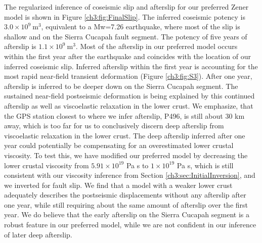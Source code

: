 The regularized inference of coseismic slip and afterslip for our
preferred Zener model is shown in Figure \ref{ch3:fig:FinalSlip}.  The
inferred coseismic potency is $3.0\times10^{9}\ \mathrm{m}^3$,
equivalent to a Mw=7.26 earthquake, where most of the slip is shallow
and on the Sierra Cucapah fault segment.  The potency of five years of
afterslip is $1.1\times10^{9}\ \mathrm{m}^3$. Most of the afterslip in
our preferred model occurs within the first year after the earthquake
and coincides with the location of our inferred coseismic slip.
Inferred afterslip within the first year is accounting for the most
rapid near-field transient deformation (Figure \ref{ch3:fig:S3}).  After one year,
afterslip is inferred to be deeper down on the Sierra Cucapah segment.
The sustained near-field postseismic deformation is being explained by
this continued afterslip as well as viscoelastic relaxation in the
lower crust. We emphasize, that the GPS station closest to where we
infer afterslip, P496, is still about 30 km away, which is too far for
us to conclusively discern deep afterslip from viscoelastic relaxation
in the lower crust.  The deep afterslip inferred after one year could
potentially be compensating for an overestimated lower crustal
viscosity.  To test this, we have modified our preferred model by
decreasing the lower crustal viscosity from $5.91\times10^{19}$ Pa s
to $1\times10^{19}$ Pa s, which is still consistent with our viscosity
inference from Section \ref{ch3:sec:InitialInversion}, and we inverted
for fault slip.  We find that a model with a weaker lower crust
adequately describes the postseismic displacements without any
afterslip after one year, while still requiring about the same amount
of afterslip over the first year. We do believe that the early
afterslip on the Sierra Cucapah segment is a robust feature in our
preferred model, while we are not confident in our inference of later
deep afterslip.

